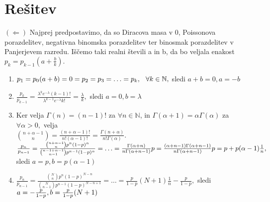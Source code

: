 \documentclass[a4paper]{article}
\begin{document}
\section{Rešitev}
$(\Leftarrow)$ Najprej predpostavimo, da so Diracova masa v 0, Poissonova porazdelitev, negativna binomska porazdelitev ter binosmak porazdelitev v Panjerjevem razredu. Iščemo taki realni števili a in b, da bo veljala enakost $p_k = p_{k-1}(a + \frac{b}{k}).$
\begin{enumerate}
	\item{$p_1=p_0(a + b) = 0 = p_2 = p_3 = \ldots = p_k, \hspace{0.25cm} \forall k \in \mathbb{N},$ sledi $a + b = 0, a=-b$}
	\item{$\frac{p_k}{p_{k-1}}=\frac{\lambda^k e^{-\lambda}(k-1)!}{\lambda^{k-1} e^{-\lambda}k!} = \frac{\lambda}{k}, $ sledi $ a = 0, b = \lambda$} 
	\item{Ker velja $\Gamma(n)=(n-1)!$  za $\forall n \in \mathbb{N}$, in $\Gamma(\alpha+1)=\alpha\Gamma(\alpha)$ za $\forall \alpha > 0,$ velja \\[1.5mm] ${n +\alpha - 1 \choose n} = \frac{(n+\alpha-1)!}{n!(\alpha-1)!}=\frac{\Gamma(n+\alpha)}{n!\Gamma(\alpha)}.$ \\[1.5mm] $\frac{p_n}{p_{n-1}}=\frac{\binom{n + \alpha - 1}{n}p^n(1-p)^{\alpha}}{\binom{n-1+\alpha-1}{n-1}p^{n-1}(1-p)^\alpha}=\ldots=\frac{\Gamma(\alpha+n)}{n\Gamma(\alpha+n-1)}p=\frac{(\alpha+n-1)\Gamma(\alpha+n-1)}{n\Gamma(\alpha+n-1)}p= \\[1.5mm] p+p(\alpha-1)\frac{1}{n}, $ sledi $ a=p, b=p(\alpha-1)$}
	\item{$\frac{p_n}{p_{n-1}}=\frac{\binom{N}{n}p^n(1-p)^{N-n}}{\binom{N}{n-1}p^{n-1}(1-p)^{N-n+1}}=\ldots=\frac{p}{1-p}(N+1)\frac{1}{n}-\frac{p}{1-p}, $ sledi $ a= \\[1.5mm] -\frac{p}{1-p}, b = \frac{p}{1-p}(N+1)$}
\end{enumerate}
\end{document}
